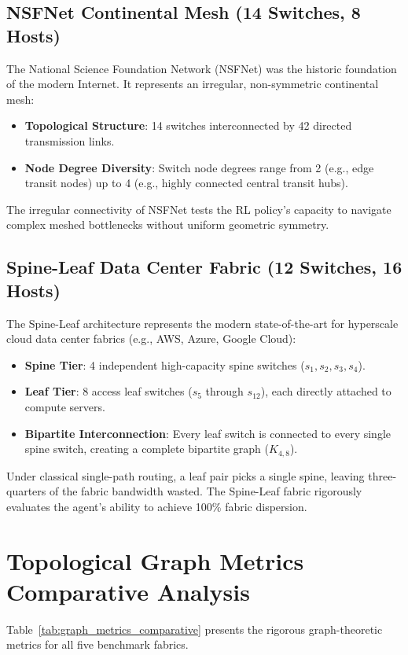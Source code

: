 \documentclass[12pt,a4paper,oneside]{report}
\begin{document}
\subsection{NSFNet Continental Mesh (14 Switches, 8 Hosts)}
The National Science Foundation Network (NSFNet) was the historic foundation of the modern Internet. It represents an irregular, non-symmetric continental mesh:
\begin{itemize}
    \item \textbf{Topological Structure}: 14 switches interconnected by 42 directed transmission links.
    \item \textbf{Node Degree Diversity}: Switch node degrees range from 2 (e.g., edge transit nodes) up to 4 (e.g., highly connected central transit hubs).
\end{itemize}
The irregular connectivity of NSFNet tests the RL policy's capacity to navigate complex meshed bottlenecks without uniform geometric symmetry.

\subsection{Spine-Leaf Data Center Fabric (12 Switches, 16 Hosts)}
The Spine-Leaf architecture represents the modern state-of-the-art for hyperscale cloud data center fabrics (e.g., AWS, Azure, Google Cloud):
\begin{itemize}
    \item \textbf{Spine Tier}: 4 independent high-capacity spine switches ($s_1, s_2, s_3, s_4$).
    \item \textbf{Leaf Tier}: 8 access leaf switches ($s_5$ through $s_{12}$), each directly attached to compute servers.
    \item \textbf{Bipartite Interconnection}: Every leaf switch is connected to every single spine switch, creating a complete bipartite graph ($K_{4, 8}$).
\end{itemize}
Under classical single-path routing, a leaf pair picks a single spine, leaving three-quarters of the fabric bandwidth wasted. The Spine-Leaf fabric rigorously evaluates the agent's ability to achieve 100\% fabric dispersion.

\section{Topological Graph Metrics Comparative Analysis}
Table~\ref{tab:graph_metrics_comparative} presents the rigorous graph-theoretic metrics for all five benchmark fabrics.
\end{document}
